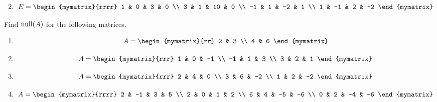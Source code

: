 \begin{enumialphparenastyle}
\begin{ex}
\begin{enumerate}
\begin{equation*}
    \end{equation*}
  \item
    \begin{equation*}
      E = \begin{mymatrix}{rrrr}
        1 & 0 & 3 & 0 \\ 
        3 & 1 & 10 & 0 \\ 
        -1 & 1 & -2 & 1 \\ 
        1 & -1 & 2 & -2
      \end{mymatrix}
    \end{equation*}
  \end{enumerate}
\end{ex}

\begin{ex}
  Find $\nullspace(A)$ for the following matrices. 
  \begin{enumerate}
  \item 
    \begin{equation*}
      A = \begin{mymatrix}{rr}
        2 & 3 \\
        4 & 6 
      \end{mymatrix}
    \end{equation*}
  \item
    \begin{equation*}
      A = \begin{mymatrix}{rrr}
        1 & 0 & -1 \\
        -1 & 1 & 3 \\
        3 & 2 & 1 
      \end{mymatrix}
    \end{equation*}
  \item 
    \begin{equation*}
      A = \begin{mymatrix}{rrr}
        2 & 4 & 0 \\
        3 & 6 & -2 \\
        1 & 2 & -2
      \end{mymatrix}
    \end{equation*}
  \item 
    \begin{equation*}
      A = \begin{mymatrix}{rrrr}
        2 & -1 & 3 & 5 \\
        2 & 0 & 1 & 2 \\
        6 & 4 & -5 & -6 \\
        0 & 2 & -4 & -6 
      \end{mymatrix}
    \end{equation*}
  \end{enumerate}
\end{ex}


\end{enumialphparenastyle}
